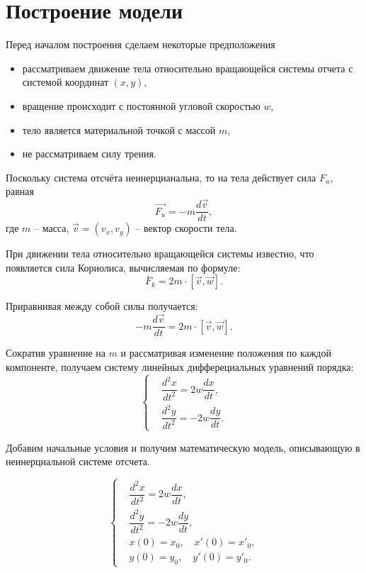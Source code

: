 \pagebreak

\section{Построение модели}
	Перед началом построения сделаем некоторые предположения
	\begin{itemize}
		\item рассматриваем движение тела относительно вращающейся системы отчета с системой координат \( (x, y) \),
		\item вращение происходит с постоянной угловой скоростью \( w \),
		\item тело является материальной точкой с массой \( m \),
		\item не рассматриваем силу трения.
	\end{itemize}

	Поскольку система отсчёта неинерцианальна, то на тела действует сила  \( F_u \), равная
	\begin{equation}
		\vec{F_u} = - m \dfrac{d \vec v}{dt},
	\end{equation}
	где \( m \) -- масса, \( \vec v = \left(v_x, v_y \right) \) --  вектор скорости тела. 

	При движении тела относительно вращающейся системы известно, что появляется сила Кориолиса, вычисляемая по формуле:
	\begin{equation}
		\bar F_k = 2m \cdot [\vec v, \vec w].
	\end{equation}

	Приравнивая между собой силы получается:
	\begin{equation}
		- m \dfrac{d \vec v}{dt} = 2m \cdot [\vec v, \vec w].
	\end{equation}

	Сократив уравнение на \( m \) и рассматривая изменение положения по каждой компоненте, получаем систему линейных дифферециальных уравнений  порядка:
	\begin{equation}
		\begin{cases}
			&\dfrac{d^2 x}{dt^2} = 2w \dfrac{dx}{dt}, \\
			&\dfrac{d^2 y}{dt^2} = -2w \dfrac{dy}{dt}.
		\end{cases}
	\end{equation}

	Добавим начальные условия и получим математическую модель, описывающую в неинерциальной системе отсчета.

	\begin{equation}
		\begin{cases}
			&\dfrac{d^2 x}{dt^2} = 2w \dfrac{dx}{dt}, \\
			&\dfrac{d^2 y}{dt^2} = -2w \dfrac{dy}{dt}, \\
			& x(0) = x_0, \quad x'(0) = x'_0, \\
			& y(0) = y_0, \quad y'(0) = y'_0.
		\end{cases}
	\end{equation}

\pagebreak